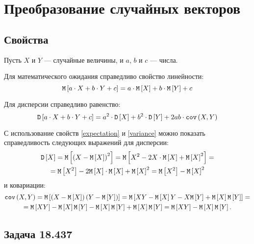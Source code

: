 \chapter{Преобразование случайных векторов}


\section{Свойства}
Пусть $X$ и $Y$ --- случайные величины, и $a$, $b$ и $c$ --- числа.

Для математического ожидания справедливо свойство линейности:
\begin{equation}
    \label{expectation}
    \mathtt{M} \left [ a \cdot X + b \cdot Y + c \right ]
    = a \cdot \mathtt{M} \left [ X \right ] + b \cdot \mathtt{M} \left [ Y \right ] + c
\end{equation}

Для дисперсии справедливо равенство:
\begin{equation}
    \label{variance}
    \mathtt{D} \left [ a \cdot X + b \cdot Y + c \right ]
    = a^2 \cdot \mathtt{D} \left [ X \right ] + b^2 \cdot \mathtt{D} \left [ Y \right ] + 2 a b \cdot \texttt{cov} \left ( X , Y \right )
\end{equation}

С использование свойств \eqref{expectation} и \eqref{variance} можно показать справедливость следующих выражений для дисперсии:
\begin{multline}
    \mathtt{D} \left [ X \right ]
    = \mathtt{M} \left [ \left ( X - \mathtt{M} \left [ X \right ] \right )^2 \right ]
    = \mathtt{M} \left [ X^2 - 2 X \cdot \mathtt{M} \left [ X \right ] + \mathtt{M} \left [ X \right ]^2 \right ] = \\
    = \mathtt{M} \left [ X^2 \right ] - 2 \mathtt{M} \left [ X \right ] \cdot \mathtt{M} \left [ X \right ] + \mathtt{M} \left [ X \right ]^2
    = \mathtt{M} \left [ X^2 \right ] - \mathtt{M} \left [ X \right ]^2
\end{multline}
и ковариации:
\begin{multline}
    \label{covariance}
    \texttt{cov} \left ( X , Y \right )
    = \mathtt{M} \left [ \left ( X - \mathtt{M} \left [ X \right ] \right ) \left ( Y - \mathtt{M} \left [ Y \right ] \right ) \right ]
    = \mathtt{M} \left [  X Y - \mathtt{M} \left [ X \right ] Y - X \mathtt{M} \left [ Y \right ] + \mathtt{M} \left [ X \right ] \mathtt{M} \left [ Y \right ] \right ] = \\
    = \mathtt{M} \left [ XY \right ] - \mathtt{M} \left [ X \right ] \mathtt{M} \left [ Y \right ] - \mathtt{M} \left [ X \right ] \mathtt{M} \left [ Y \right ] + \mathtt{M} \left [ X \right ] \mathtt{M} \left [ Y \right ]
    = \mathtt{M} \left [ XY \right ] - \mathtt{M} \left [ X \right ] \mathtt{M} \left [ Y \right ] .
\end{multline}


\section{Задача 18.437}
